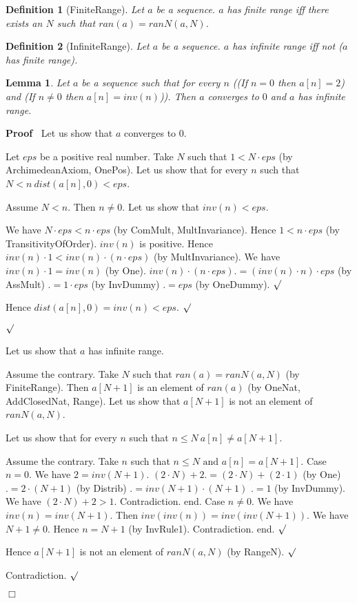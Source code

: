 \documentclass{article}
\newenvironment{forthel}{\begin{leftbar}}{\end{leftbar}}
\newenvironment{proof}{\noindent\textbf{Proof\ }}{\hspace*{\fill}$\Box$\medskip}
\newenvironment{subproof}{\begin{list}{}{}
		\item[\text{Proof}]}{\hfill $\surd$ \end{list}}
\newtheorem{lemma}{Lemma}
\newtheorem{definition}{Definition}
\begin{document}
\begin{forthel}
	\begin{definition}[FiniteRange]	Let $a$ be a sequence. $a$ has finite range iff there exists an $N$ such that $ran(a) = ranN(a,N)$.
	\end{definition}

	\begin{definition}[InfiniteRange] Let $a$ be a sequence. $a$ has infinite range iff not ($a$ has finite range).
	\end{definition}
	
	\begin{lemma} Let $a$ be a sequence such that for every $n$
	((If $n = 0$ then $a[n] = 2$) and (If $n \neq 0$ then $a[n] = inv(n)$)).
	Then $a$ converges to $0$ and $a$ has infinite range.
	\end{lemma}
	\begin{proof} Let us show that $a$ converges to $0$.
	\begin{subproof}
	Let $eps$ be a positive real number. 
	Take $N$ such that $1 < N \cdot eps$ (by ArchimedeanAxiom, OnePos).
	Let us show that for every $n$ such that $N < n \ dist(a[n],0) < eps$.
	\begin{subproof}
	Assume $N < n$. Then $n \neq 0$.
	Let us show that $inv(n) < eps$.
	\begin{subproof}
	We have $N \cdot eps < n \cdot eps$ (by ComMult, MultInvariance).
	Hence $1 < n \cdot eps$ (by TransitivityOfOrder).
	$inv(n)$ is positive.
	Hence $inv(n) \cdot 1 < inv(n) \cdot (n \cdot eps)$ (by MultInvariance).
	We have $inv(n) \cdot 1 = inv(n)$ (by One).
	$inv(n) \cdot (n \cdot eps) .= (inv(n) \cdot n) \cdot eps$ (by AssMult)
	$.= 1 \cdot eps$ (by InvDummy)
	$.= eps$ (by OneDummy).
	\end{subproof}
	Hence $dist(a[n],0) = inv(n) < eps$.
	\end{subproof}
	\end{subproof}
	Let us show that $a$ has infinite range.
	\begin{subproof}
	Assume the contrary.
	Take $N$ such that $ran(a) = ranN(a,N)$ (by FiniteRange).
	Then $a[N + 1]$ is an element of $ran(a)$ (by OneNat, AddClosedNat, Range).
	Let us show that $a[N + 1]$ is not an element of $ranN(a,N)$.
	\begin{subproof}
	Let us show that for every $n$ such that $n \leq N \ a[n] \neq a[N + 1]$.
	\begin{subproof}
	Assume the contrary.
	Take $n$ such that $n \leq N \text{ and } a[n] = a[N + 1]$.
	Case $n = 0$.
	We have $2 = inv(N + 1)$.
	$(2 \cdot N) + 2 .= (2 \cdot N) + (2 \cdot 1)$ (by One)
	$.= 2 \cdot (N + 1)$ (by Distrib)
	$.= inv(N + 1) \cdot (N + 1)$
	$.= 1$ (by InvDummy).
	We have $(2 \cdot N) + 2 > 1$.
	Contradiction.
	end.
	Case $n \neq 0$.
	We have $inv(n) = inv(N + 1)$.
	Then $inv(inv(n)) = inv(inv(N + 1))$.
	We have $N + 1 \neq 0$.
	Hence $n = N + 1$ (by InvRule1).
	Contradiction.
	end.
	\end{subproof}
	Hence $a[N + 1]$ is not an element of $ranN(a,N)$ (by RangeN).
	\end{subproof}
	Contradiction.
	\end{subproof}
	\end{proof}
	

\end{forthel}
\end{document}
